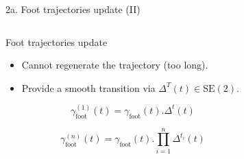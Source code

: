 \documentclass[hyperref={pdfpagelabels=false}]{beamer}
\begin{document}
\begin{frame}{2a. Foot trajectories update (II)}

  \begin{columns}[c]
    \begin{column}{0.5\textwidth}

      \begin{block}{Foot trajectories update}
        \begin{itemize}
          \item Cannot regenerate the trajectory (too long).
          \item Provide a smooth transition via $\Delta^T (t) \in \text{SE}(2)$.
        \end{itemize}

        \begin{equation}
          \gamma_{\text{foot}}^{(1)}(t) = \gamma_{\text{foot}}(t) . \Delta^t(t)
        \end{equation}

        \begin{equation}
          \gamma_{\text{foot}}^{(n)}(t) = \gamma_{\text{foot}}(t) . \prod_{i=1}^{n}\Delta^{t_i}(t)
        \end{equation}
      \end{block}
    \end{column}

    \begin{column}{0.5\textwidth}

\begin{figure}[ht!]
  \begin{center}

\end{center}
\end{figure}
\end{column}
\end{columns}
\end{frame}
\end{document}
